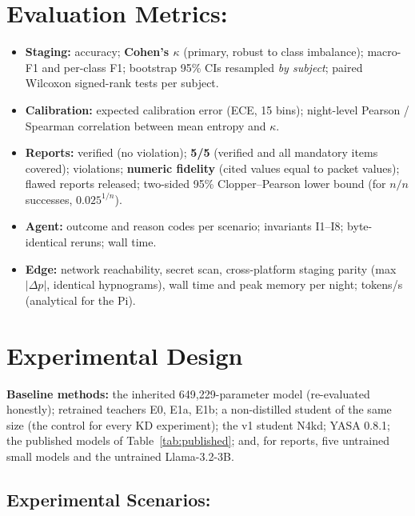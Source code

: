 \section{Evaluation Metrics:}

\begin{itemize}
  \item \textbf{Staging:} accuracy; \textbf{Cohen's $\kappa$} (primary, robust to class imbalance); macro-F1 and
  per-class F1; bootstrap 95\% CIs resampled \emph{by subject}; paired Wilcoxon signed-rank tests per subject.
  \item \textbf{Calibration:} expected calibration error (ECE, 15 bins); night-level Pearson / Spearman correlation
  between mean entropy and $\kappa$.
  \item \textbf{Reports:} verified (no violation); \textbf{5/5} (verified and all mandatory items covered);
  violations; \textbf{numeric fidelity} (cited values equal to packet values); flawed reports released; two-sided
  95\% Clopper--Pearson lower bound (for $n/n$ successes, $0.025^{1/n}$).
  \item \textbf{Agent:} outcome and reason codes per scenario; invariants I1--I8; byte-identical reruns; wall time.
  \item \textbf{Edge:} network reachability, secret scan, cross-platform staging parity (max $|\Delta p|$, identical
  hypnograms), wall time and peak memory per night; tokens/s (analytical for the Pi).
\end{itemize}

\section{Experimental Design}

\textbf{Baseline methods:} the inherited 649,229-parameter model (re-evaluated honestly); retrained teachers E0,
E1a, E1b; a non-distilled student of the same size (the control for every KD experiment); the v1 student N4kd;
YASA 0.8.1; the published models of Table~\ref{tab:published}; and, for reports, five untrained small models and
the untrained Llama-3.2-3B.

\subsection{Experimental Scenarios:}

